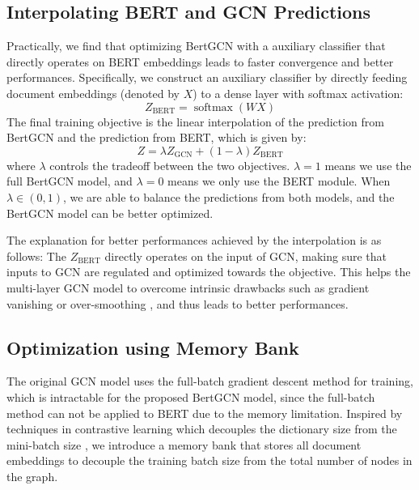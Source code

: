 \documentclass[11pt,a4paper]{article}
\begin{document}
 \subsection{Interpolating BERT and GCN Predictions}
Practically, we find that optimizing BertGCN with a auxiliary classifier that directly operates on BERT embeddings leads to faster convergence and better performances. 
Specifically, we construct an auxiliary classifier by directly feeding document embeddings (denoted by $X$) to a dense layer with softmax activation:
\begin{equation}
  Z_\text{BERT} = \operatorname{softmax}(WX)
\end{equation}
The final training objective is the linear interpolation of the prediction from BertGCN and the prediction from BERT, which is given by:
\begin{equation}
    Z = \lambda Z_\text{GCN} + (1-\lambda) Z_\text{BERT}
\end{equation} 
where $\lambda$ controls the tradeoff between the two objectives. 
$\lambda=1$ means we use the full BertGCN model, and $\lambda=0$ means we only use the BERT module. When $\lambda\in (0,1)$, we are able to balance the predictions from both models, and the BertGCN model can be better optimized.

The explanation for better performances achieved by the interpolation is as follows: 
The $Z_\text{BERT}$ directly operates on the input of GCN, making sure that inputs to GCN are regulated and optimized towards the  objective.
This helps the multi-layer GCN model to overcome intrinsic drawbacks such as gradient vanishing or over-smoothing \citep{li2018deeper}, and thus leads to better performances. 




 \subsection{Optimization using Memory Bank}
 


The original GCN model uses the full-batch gradient descent method for training, which is intractable for the proposed BertGCN model, since the full-batch method can not be applied to BERT due to the memory limitation.
Inspired by techniques in contrastive learning which decouples the dictionary size from the mini-batch size \citep{wu2018unsupervised,he2020momentum}, we introduce a memory bank that stores all document embeddings to decouple the training batch size from the total number of nodes in the graph.
 
\end{document}
